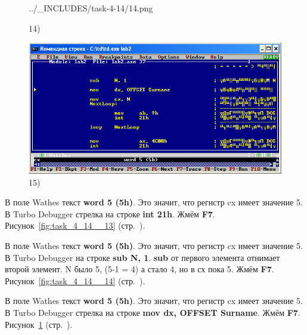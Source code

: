 \begin{figure}[!htp]
\begin {minipage}{0.32\textwidth}
            {../_INCLUDES/task-4-14/14.png}
        \caption{14) }
        \label{fig:task_4_14__14}
    \end{minipage}
    \begin {minipage}{0.32\textwidth}
        \centering
        \includegraphics[width=.99\linewidth]
            {../_INCLUDES/task-4-14/15.png}
        \caption{15) }
        \label{fig:task_4_14__15}
    \end{minipage}
\end{figure}

В поле Wathes текст \textbf{word 5 (5h)}.
Это значит, что регистр cx имеет значение 5.
В Turbo Debugger стрелка на строке \textbf{int 21h}.
Жмём \textbf{F7}.
Рисунок~\ref{fig:task_4_14__13} (стр.~\pageref{fig:task_4_14__13}).

В поле Wathes текст \textbf{word 5 (5h)}.
Это значит, что регистр cx имеет значение 5.
В Turbo Debugger на строке \textbf{sub N, 1}.
\textbf{sub} от первого элемента отнимает второй элемент.
N было 5, (5-1 = 4) а стало 4, но в сх пока 5.
Жмём \textbf{F7}.
Рисунок~\ref{fig:task_4_14__14} (стр.~\pageref{fig:task_4_14__14}).

В поле Wathes текст \textbf{word 5 (5h)}.
Это значит, что регистр cx имеет значение 5.
В Turbo Debugger стрелка на строке \textbf{mov dx, OFFSET Surname}.
Жмём \textbf{F7}.
Рисунок~\ref{fig:task_4_14__15} (стр.~\pageref{fig:task_4_14__15}).


